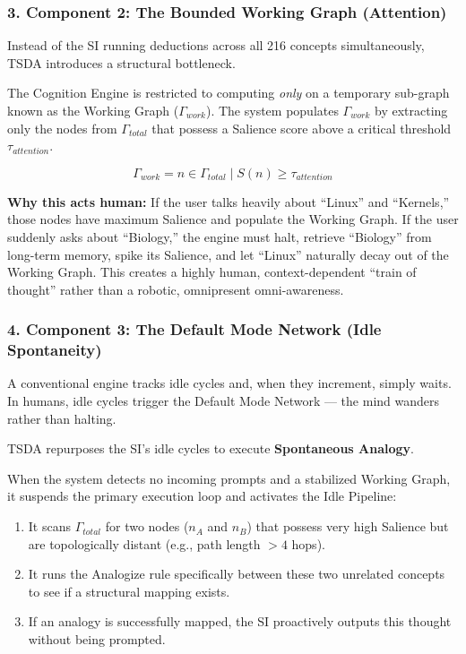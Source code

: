\documentclass[
  11pt,
  a4paper,
]{article}
\providecommand{\tightlist}{%
  \setlength{\itemsep}{0pt}\setlength{\parskip}{0pt}}
\begin{document}
\subsubsection{3. Component 2: The Bounded Working Graph
(Attention)}\label{component-2-the-bounded-working-graph-attention}

Instead of the SI running deductions across all 216 concepts
simultaneously, TSDA introduces a structural bottleneck.

The Cognition Engine is restricted to computing \emph{only} on a
temporary sub-graph known as the Working Graph (\(\Gamma_{work}\)). The
system populates \(\Gamma_{work}\) by extracting only the nodes from
\(\Gamma_{total}\) that possess a Salience score above a critical
threshold \(\tau_{attention}\).

\[ \Gamma_{work} = { n \in \Gamma_{total} \mid S(n) \ge \tau_{attention} } \]

\textbf{Why this acts human:} If the user talks heavily about ``Linux''
and ``Kernels,'' those nodes have maximum Salience and populate the
Working Graph. If the user suddenly asks about ``Biology,'' the engine
must halt, retrieve ``Biology'' from long-term memory, spike its
Salience, and let ``Linux'' naturally decay out of the Working Graph.
This creates a highly human, context-dependent ``train of thought''
rather than a robotic, omnipresent omni-awareness.

\subsubsection{4. Component 3: The Default Mode Network (Idle
Spontaneity)}\label{component-3-the-default-mode-network-idle-spontaneity}

A conventional engine tracks idle cycles and, when they increment,
simply waits. In humans, idle cycles trigger the Default Mode Network
--- the mind wanders rather than halting.

TSDA repurposes the SI's idle cycles to execute \textbf{Spontaneous
Analogy}.

When the system detects no incoming prompts and a stabilized Working
Graph, it suspends the primary execution loop and activates the Idle
Pipeline:

\begin{enumerate}
\def\labelenumi{\arabic{enumi}.}
\tightlist
\item
  It scans \(\Gamma_{total}\) for two nodes (\(n_A\) and \(n_B\)) that
  possess very high Salience but are topologically distant (e.g., path
  length \(> 4\) hops).
\item
  It runs the Analogize rule specifically between these two unrelated
  concepts to see if a structural mapping exists.
\item
  If an analogy is successfully mapped, the SI proactively outputs this
  thought without being prompted.
\end{enumerate}
\end{document}
